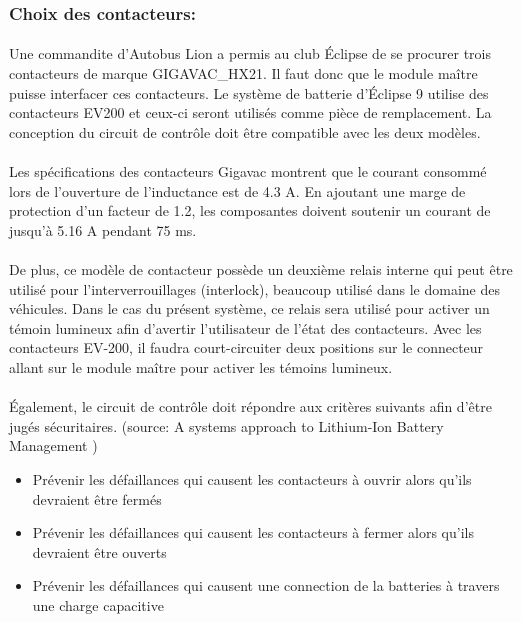 	\subsubsection*{Choix des contacteurs:}
		\paragraph*{}
		Une commandite d'Autobus Lion a permis au club Éclipse de se procurer trois contacteurs de marque GIGAVAC\_HX21. Il faut donc que le module maître puisse interfacer ces contacteurs. Le système de batterie d'Éclipse 9 utilise des contacteurs EV200 et ceux-ci seront utilisés comme pièce de remplacement. La conception du circuit de contrôle doit être compatible avec les deux modèles.

		\paragraph*{}
		Les spécifications des contacteurs Gigavac montrent que le courant consommé lors de l'ouverture de l'inductance est de 4.3 A. En ajoutant une marge de protection d'un facteur de 1.2, les composantes doivent soutenir un courant de jusqu'à 5.16 A pendant 75 ms. 

		\paragraph*{}
		De plus, ce modèle de contacteur possède un deuxième relais interne qui peut être utilisé pour l'interverrouillages (interlock), beaucoup utilisé dans le domaine des véhicules. Dans le cas du présent système, ce relais sera utilisé pour activer un témoin lumineux afin d'avertir l'utilisateur de l'état des contacteurs. Avec les contacteurs EV-200, il faudra court-circuiter deux positions sur le connecteur allant sur le module maître pour activer les témoins lumineux.

		\paragraph*{}
		Également, le circuit de contrôle doit répondre aux critères suivants afin d'être jugés sécuritaires. (source: A systems approach to Lithium-Ion Battery Management )


		\begin{itemize}
			\item Prévenir les défaillances qui causent les contacteurs à ouvrir alors qu'ils devraient être fermés
			\item Prévenir les défaillances qui causent les contacteurs à fermer alors qu'ils devraient être ouverts
			\item Prévenir les défaillances qui causent une connection de la batteries à travers une charge	capacitive	
		\end{itemize}


